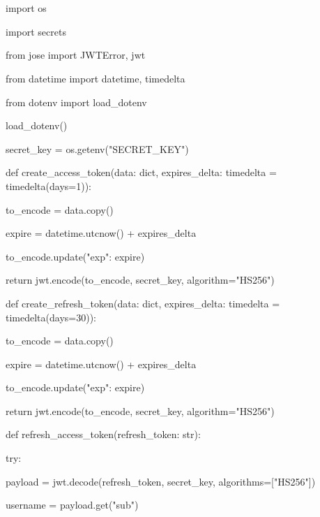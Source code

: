\documentclass[a4paper,12pt]{article}
\begin{document}
\section*{}
\begin{description}
 \item import os
 \item import secrets

 \item from jose import JWTError, jwt
 \item from datetime import datetime, timedelta
 \item from dotenv import load\_dotenv

 \item load\_dotenv()
 \item secret\_key = os.getenv("SECRET\_KEY")


 \item def create\_access\_token(data: dict, expires\_delta: timedelta = timedelta(days=1)):
 	\item \hspace{10mm} to\_encode = data.copy()
 	\item \hspace{10mm} expire = datetime.utcnow() + expires\_delta
 	\item \hspace{10mm} to\_encode.update({"exp": expire})
 	\item \hspace{10mm} return jwt.encode(to\_encode, secret\_key, algorithm="HS256")


 \item def create\_refresh\_token(data: dict, expires\_delta: timedelta = timedelta(days=30)):
 	\item \hspace{10mm}to\_encode = data.copy()
 	\item \hspace{10mm} expire = datetime.utcnow() + expires\_delta
 	\item \hspace{10mm} to\_encode.update({"exp": expire})
 	\item \hspace{10mm} return jwt.encode(to\_encode, secret\_key, algorithm="HS256")


 \item def refresh\_access\_token(refresh\_token: str):
 	\item \hspace{10mm} try:
         \item \hspace{20mm} payload = jwt.decode(refresh\_token, secret\_key, algorithms=["HS256"])
     	\item \hspace{20mm} username = payload.get("sub")


\end{description}
\end{document}
